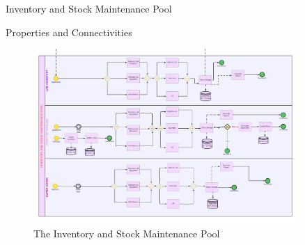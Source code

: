 \documentclass[20pt]{beamer}
\numberwithin{figure}{section}
\begin{document}
\begin{frame}{Inventory and Stock Maintenance Pool}

    \begin{alertblock}{Properties and Connectivities}

    \vspace{10}


    \vspace{10}

    \end{alertblock}

    \begin{figure}
        \centering
        \includegraphics[width= 0.9\textwidth , height= 0.4\paperheight]{Pool2.png}
        \caption{{The Inventory and Stock Maintenance Pool}}
        \label{fig:2}
    \end{figure}

\end{frame}
\end{document}
